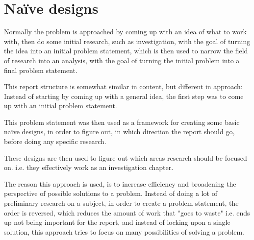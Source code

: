\section{Naïve designs}
Normally the problem is approached by coming up with an idea of what to work with, then do some initial research, such as investigation, with the goal of turning the idea into an initial problem statement, which is then used to narrow the field of research into an analysis, with the goal of turning the initial problem into a final problem statement.

This report structure is somewhat similar in content, but different in approach:
Instead of starting by coming up with a general idea, the first step was to come up with an initial problem statement.

This problem statement was then used as a framework for creating some basic naïve designs, in order to figure out, in which direction the report should go, before doing any specific research.

These designs are then used to figure out which areas research should be focused on. i.e. they effectively work as an investigation chapter.
\bigskip

The reason this approach is used, is to increase efficiency and broadening the perspective of possible solutions to a problem. Instead of doing a lot of preliminary research on a subject, in order to create a problem statement, the order is reversed, which reduces the amount of work that "goes to waste" i.e. ends up not being important for the report, and instead of locking upon a single solution, this approach tries to focus on many possibilities of solving a problem.



